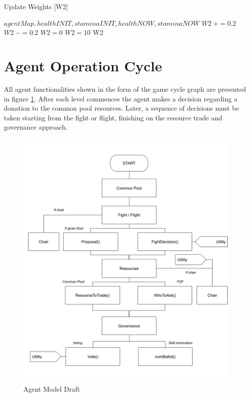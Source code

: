 \begin{algorithm}[ht]
\caption{Update Weights [W2]}\label{alg:7}
\begin{algorithmic} 
\scriptsize
\Require $agentMap, healthINIT, staminaINIT,healthNOW, staminaNOW$
\State $W2~+= 0.2$
\Else
\State $W2~-= 0.2$
\EndIf
{}
\State $W2 = 0$
\EndIf
{}
\State $W2 = 10$
\EndIf
\State
\Return W2
\end{algorithmic}
\end{algorithm}

\clearpage
\section{Agent Operation Cycle}

All agent functionalities shown in the form of the game cycle graph are presented in figure \ref{fig:agent_model}. After each level commences the agent makes a decision regarding a donation to the common pool resources. Later, a sequence of decisions must be taken starting from the fight or flight, finishing on the resource trade and governance approach.

\begin{figure}[htb]
    \centering
    \includegraphics[scale=0.35]{006_team_3_agent_design/FIGS/diagram.png}
    \caption{Agent Model Draft}
    \label{fig:agent_model}
\end{figure}

